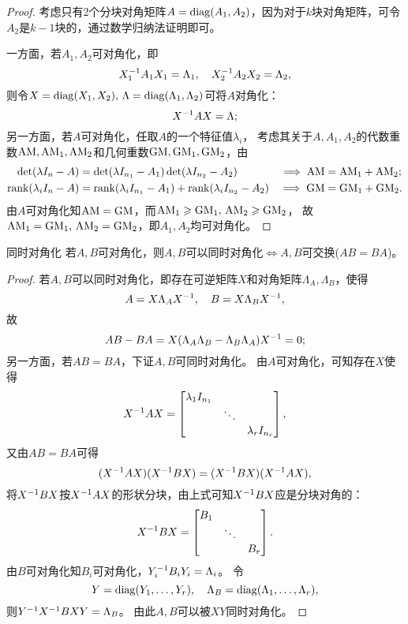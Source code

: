 \begin{proof}
	考虑只有2个分块对角矩阵$A=\operatorname{diag}(A_1,A_2)$，因为对于$k$块对角矩阵，可令$A_2$是$k-1$块的，通过数学归纳法证明即可。

	一方面，若$A_1,A_2$可对角化，即
	\[
		X_1^{-1} A_1X_1=\Lambda_1,\quad X_2^{-1} A_2X_2=\Lambda_2,
	\]
	则令$X=\operatorname{diag}(X_1,X_2),\,\Lambda=\operatorname{diag}(\Lambda_1,\Lambda_2)$可将$A$对角化：
	\[
		X^{-1} AX=\Lambda;
	\]
	另一方面，若$A$可对角化，任取$A$的一个特征值$\lambda_i$，
	考虑其关于$A,A_1,A_2$的代数重数$\mathrm{AM},\mathrm{AM}_1,\mathrm{AM}_2$和几何重数$\mathrm{GM},\mathrm{GM}_1,\mathrm{GM}_2$，由
	\begin{alignat*}{2}
		\det(\lambda I_n-A)&=\det(\lambda I_{n_1}-A_1)\det(\lambda I_{n_2}-A_2)&\implies\mathrm{AM}&=\mathrm{AM}_1+\mathrm{AM}_2;\\
		\operatorname{rank}(\lambda_iI_n-A)&=\operatorname{rank}(\lambda_iI_{n_1}-A_1)+\operatorname{rank}(\lambda_iI_{n_2}-A_2)&\implies\mathrm{GM}&=\mathrm{GM}_1+\mathrm{GM}_2.
	\end{alignat*}
	由$A$可对角化知$\mathrm{AM}=\mathrm{GM}$，而$\mathrm{AM}_1\geqslant\mathrm{GM}_1,\,\mathrm{AM}_2\geqslant\mathrm{GM}_2$，
	故$\mathrm{AM}_1=\mathrm{GM}_1,\,\mathrm{AM}_2=\mathrm{GM}_2$，即$A_1,A_2$均可对角化。
\end{proof}

\begin{theorem}{同时对角化}{}
	若$A,B$可对角化，则$A,B$可以同时对角化$\iff A,B$可交换($AB=BA$)。
\end{theorem}

\begin{proof}
	若$A,B$可以同时对角化，即存在可逆矩阵$X$和对角矩阵$\Lambda_A,\Lambda_B$，使得
	\[
		A=X\Lambda_AX^{-1},\quad B=X\Lambda_BX^{-1},
	\]
	故
	\[
		AB-BA=X(\Lambda_A\Lambda_B-\Lambda_B\Lambda_A)X^{-1}=0;
	\]
	另一方面，若$AB=BA$，下证$A,B$可同时对角化。
	由$A$可对角化，可知存在$X$使得
	\[
		X^{-1} AX=\begin{bmatrix}
			\lambda_1I_{n_1}\\ &\ddots\\ &&\lambda_rI_{n_r}
		\end{bmatrix},
	\]
	又由$AB=BA$可得
	\[
		(X^{-1} AX)(X^{-1} BX)=(X^{-1} BX)(X^{-1} AX),
	\]
	将$X^{-1} BX$按$X^{-1} AX$的形状分块，由上式可知$X^{-1} BX$应是分块对角的：
	\[
		X^{-1} BX=\begin{bmatrix}
			B_1\\ &\ddots\\ &&B_r
		\end{bmatrix}.
	\]
	由$B$可对角化知$B_i$可对角化，$Y_i^{-1} B_iY_i=\Lambda_i$。
	令
	\[
		Y=\operatorname{diag}(Y_1,\ldots,Y_r),
		\quad
		\Lambda_B=\operatorname{diag}(\Lambda_1,\ldots,\Lambda_r),
	\]
	则$Y^{-1} X^{-1} BXY=\Lambda_B$。
	由此$A,B$可以被$XY$同时对角化。
\end{proof}

